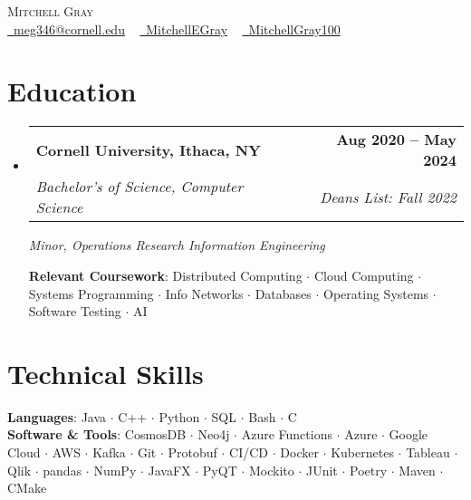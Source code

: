 \documentclass[letterpaper,11pt]{article}
\makeatletter
\newcommand{\resumeSubheading}[4]{
  \vspace{-2pt}\item
    \begin{tabular*}{1.0\textwidth}[t]{l@{\extracolsep{\fill}}r}
      \textbf{#1} & \textbf{\small #2} \\
      \textit{\small#3} & \textit{\small #4} \\
    \end{tabular*}\vspace{-7pt}
}
\newcommand{\resumeSubHeadingListStart}{\begin{itemize}[leftmargin=0.0in, label={}]}
\newcommand{\resumeSubHeadingListEnd}{\end{itemize}}
\makeatother
\begin{document}
\begin{center}
    {\Huge \scshape Mitchell Gray} \\ \vspace{1pt}
    \small
    \href{mailto:youremail@gmail.com}{\faEnvelope\ meg346@cornell.edu} ~ 
    \href{https://www.linkedin.com/in/mitchellegray/}{\faLinkedin\ MitchellEGray}  ~
    \href{https://github.com/MitchellGray100}{\faGithub\ MitchellGray100}
    \vspace{-8pt}
\end{center}


\section{Education}
  \resumeSubHeadingListStart
    \resumeSubheading
      {Cornell University, Ithaca, NY}{Aug 2020 -- May 2024}
      {Bachelor's of Science, Computer Science}{Deans List: Fall 2022}

      \small{\emph{Minor, Operations Research Information Engineering}}{}

      \textbf{Relevant Coursework}: Distributed Computing $\cdot$ Cloud 
      Computing $\cdot$ Systems Programming $\cdot$ Info Networks $\cdot$ Databases 
      $\cdot$ Operating Systems $\cdot$ Software Testing $\cdot$ AI 
               

  \resumeSubHeadingListEnd
\vspace{-18pt}

\section{Technical Skills}
 \begin{itemize}[leftmargin=0.1in, label={}]
    \small{\item{
     \textbf{Languages}{: Java $\cdot$ C++ $\cdot$ Python $\cdot$ SQL $\cdot$ Bash $\cdot$ C} \\
     \textbf{Software \& Tools}{: 
     CosmosDB $\cdot$ Neo4j $\cdot$ 
     Azure Functions $\cdot$ Azure $\cdot$ Google Cloud $\cdot$ AWS $\cdot$ Kafka $\cdot$
     Git $\cdot$ Protobuf $\cdot$ CI/CD $\cdot$ Docker $\cdot$ Kubernetes
     $\cdot$ Tableau $\cdot$ Qlik $\cdot$ pandas $\cdot$ NumPy $\cdot$
     JavaFX $\cdot$ PyQT $\cdot$ 
     Mockito $\cdot$ JUnit $\cdot$
     Poetry $\cdot$ Maven $\cdot$ CMake}\\
    }}
 \end{itemize}
 \vspace{-20pt}
\end{document}

